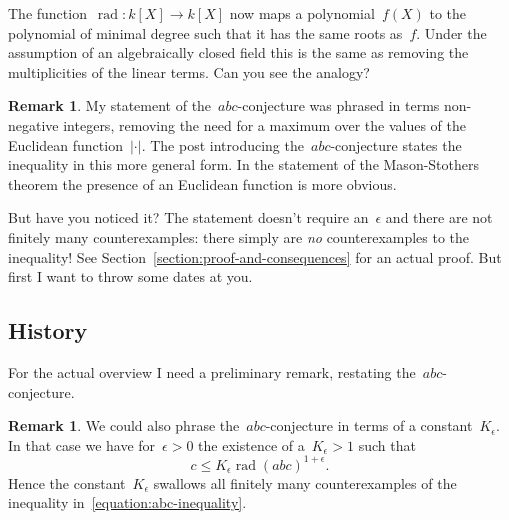 \documentclass[11pt, a4paper, openany, oneside, article]{memoir}
\theoremstyle{definition}
\newtheorem{remark}[theorem]{Remark}
\DeclareMathOperator\rad{rad}
\begin{document}
The function~$\rad\colon k[X]\to k[X]$ now maps a polynomial~$f(X)$ to the polynomial of minimal degree such that it has the same roots as~$f$. Under the assumption of an algebraically closed field this is the same as removing the multiplicities of the linear terms. Can you see the analogy?

\begin{remark}
  My statement of the~$abc$\nobreakdash-conjecture was phrased in terms non-negative integers, removing the need for a maximum over the values of the Euclidean function~$|\cdot|$. The post introducing the~$abc$\nobreakdash-conjecture states the inequality in this more general form. In the statement of the Mason-Stothers theorem the presence of an Euclidean function is more obvious.
\end{remark}

But have you noticed it? The statement doesn't require an~$\epsilon$ and there are not finitely many counterexamples: there simply are \emph{no} counterexamples to the inequality! See Section~\ref{section:proof-and-consequences} for an actual proof. But first I want to throw some dates at you.

\subsection{History}

For the actual overview I need a preliminary remark, restating the~$abc$\nobreakdash-conjecture.
\begin{remark}
  \label{remark:abc-with-factor}
  We could also phrase the~$abc$\nobreakdash-conjecture in terms of a constant~$K_{\epsilon}$. In that case we have for~$\epsilon>0$ the existence of a~$K_{\epsilon}>1$ such that
  \begin{equation}
    c\leq K_{\epsilon}\rad(abc)^{1+\epsilon}.
  \end{equation}
  Hence the constant~$K_{\epsilon}$ swallows all finitely many counterexamples of the inequality in~\eqref{equation:abc-inequality}.
\end{remark}
\end{document}
